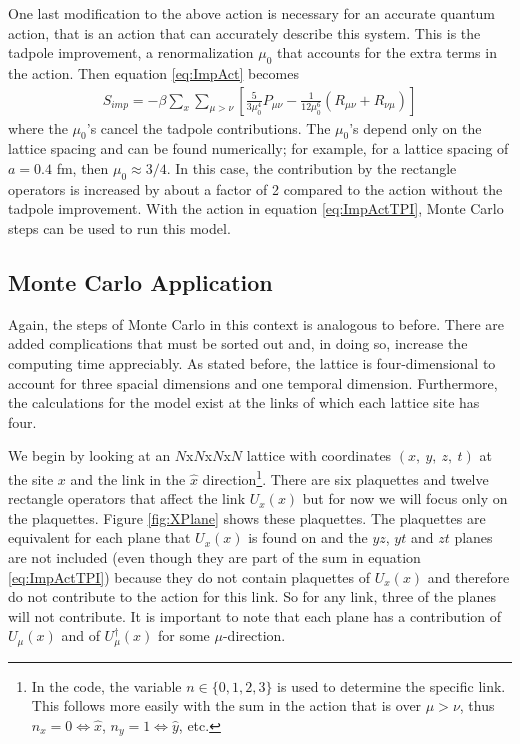 \documentclass[11pt]{article}
\begin{document}
One last modification to the above action is necessary for an accurate quantum action, that is an action that can accurately describe this system. This is the tadpole improvement, a renormalization $\mu_0$ that accounts for the extra terms in the action. Then equation \ref{eq:ImpAct} becomes
\begin{align}
	S_{imp}=-\beta\sum_x\sum_{\mu>\nu}\left[\frac{5}{3\mu_0^4}P_{\mu\nu}-\frac{1}{12\mu_0^6}(R_{\mu\nu}+R_{\nu\mu})\right]
	\label{eq:ImpActTPI}
\end{align}
where the $\mu_0$'s cancel the tadpole contributions. The $\mu_0$'s depend only on the lattice spacing and can be found numerically; for example, for a lattice spacing of $a=0.4$ fm, then $\mu_0\approx3/4$. In this case, the contribution by the rectangle operators is increased by about a factor of 2 compared to the action without the tadpole improvement. With the action in equation \ref{eq:ImpActTPI}, Monte Carlo steps can be used to run this model.

\subsection{Monte Carlo Application}
Again, the steps of Monte Carlo in this context is analogous to before. There are added complications that must be sorted out and, in doing so, increase the computing time appreciably. As stated before, the lattice is four-dimensional to account for three spacial dimensions and one temporal dimension. Furthermore, the calculations for the model exist at the links of which each lattice site has four.

We begin by looking at an $N$x$N$x$N$x$N$ lattice with coordinates $(x,\ y,\ z,\ t)$ at the site $x$ and the link in the $\hat{x}$ direction\footnote{In the code, the variable $n\in\{0,1,2,3\}$ is used to determine the specific link. This follows more easily with the sum in the action that is over $\mu>\nu$, thus $n_x=0\Leftrightarrow\hat{x}$, $n_y=1\Leftrightarrow\hat{y}$, etc.}. There are six plaquettes and twelve rectangle operators that affect the link $U_x(x)$ but for now we will focus only on the plaquettes. Figure \ref{fig:XPlane} shows these plaquettes. The plaquettes are equivalent for each plane that $U_x(x)$ is found on and the $yz$, $yt$ and $zt$ planes are not included (even though they are part of the sum in equation \ref{eq:ImpActTPI}) because they do not contain plaquettes of $U_x(x)$ and therefore do not contribute to the action for this link. So for any link, three of the planes will not contribute. It is important to note that each plane has a contribution of $U_\mu(x)$ and of $U_\mu^\dagger(x)$ for some $\mu$-direction.
\end{document}
